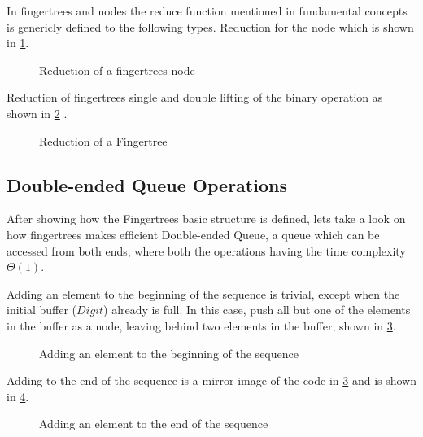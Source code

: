 In fingertrees and nodes the reduce function mentioned in fundamental concepts
is genericly defined to the following types. 
Reduction for the node which is shown in \cref{fig:reductionNode}.

\begin{figure}[h!]

\caption{Reduction of a fingertrees node \label{fig:reductionNode}}
\end{figure}

Reduction of fingertrees single and double lifting of the binary operation as
shown in \cref{fig:reductionFingerTree}
\cite{fingertree}.

\begin{figure}[h!]

\caption{Reduction of a Fingertree \label{fig:reductionFingerTree}}
\end{figure}

\subsection{Double-ended Queue Operations}
After showing how the Fingertrees basic structure is defined, lets take a look
on how fingertrees makes efficient Double-ended Queue, a queue which can be
accessed from both ends, where both the operations having the time complexity
$\Theta(1)$.

Adding an element to the beginning of the sequence is trivial, except
when the initial buffer ($Digit$) already is full. In this case, push all but
one of the elements in the buffer as a node, leaving behind two elements in the
buffer, shown in \cref{fig:AddFirst}.

\begin{figure}[h!]

\caption{Adding an element to the beginning of the sequence \label{fig:AddFirst}}
\end{figure}

Adding to the end of the sequence is a mirror image of the code in
\cref{fig:AddFirst} and is shown in \cref{fig:AddLast}.

\begin{figure}[h!]

\caption{Adding an element to the end of the sequence \label{fig:AddLast}}
\end{figure}

